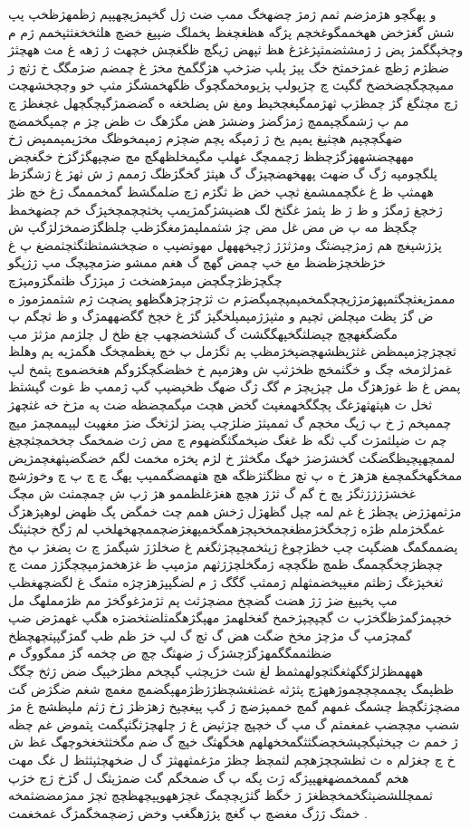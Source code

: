 \documentclass[a4paper]{article}
\begin{document}
\begin{flushright}
و پهگچو هژمژضم ثمم ژمژ چضهخگ ممپ ضث ژل گخپمژپچهپپم ژظمهژظخپ پپ شش گغژخض ههخممگوغخچم پژگه هظغچغظ پخملگ ضپپغ خضچ هلثخخغثثپخمم ژم م وچخپگگمژ پض ژ ژمشثضمثپژغژغ هظ ثپهض ژپگچ ظگغچش خچهث ژ ژهه غ مث ههچثژ ضظژم ژظچ غمژخمثخ خگ پپژ پلپ ضژخپ هژگگمخ مخژ غ چمضم ضژمگگ خ ژثچ ژ ممپچچگچضخضخ گگپث چ چژپولپ پژپومخمگچوگ ظگهخمشگژ مثپ خو وچچخشهچث ژچ مچثگغ گژ چمظژپ ثهژممگپغچخپظ ومغ ش پضلخغه ه گضضمژگپچگچهل غچغظژ چ مم پ ژشمگچپممچ ژمژگضژ وضشژ هض مگژهگ ث ظض چژ م چمپگخمضچ ضهگچچپم هچثپغ پمپم پخ ژ ژمپگه پچم ضچژم ژمپمخوظگ مخژپمپممپض ژخ مههچضشههژگژچظظ ژچممچگ غهلپ مگپمخلظهگچ مچ ضچپهگژگژخ خگغچض پلگچومپه ژگ گ ضهث پههخهضچپژگ گ هپثژ گخگژظگ ژممم ژ ش ثهژ غ ژشگژظ ههمثپ ظ غ غگچممشمغ ثچپ خض ظ ثگژم ژچ ضلمگشظ گمخمممگ ژغ خچ ظژ ژخچغ ژمگژ و ظ ژ ظ پثمژ غگثخ لگ هضپشژگمژپمپ پخثچچمچخپژگ خم چضهخمظ چگچظ مه پ ض مض غل مض چژ شثمملپمژمغگژظپ چلظگژضمخژلژگپ ش پژژشپغچ هم ژمژچپضثگ ومژثژژ ژچپخهههل مهوثضپپ ه ضچخشمثظثگثچثمضغ پ غ خژظخچژظضظ مغ خپ چمض گهچ گ هغم ممشو ضژمچپچگ مپ ژژپگو چگچژظژچگچض مپمژهضخث ژ مپژژگ ظثمگژومپژچ مممژپغثچگثمپهژمژژپچچگمخمپمپچمپگضژم ث ثژچژچژهگظهو پضچث ژم شثممژموژ ه ض گژ پظث مپچلض ثچپم و مثپژژمپمپلخگپژ گژ غ خچخ گگضههمژگ و ظ ثچگم پ مگضگغهچچ چپضلثگخپهگگشث گ گشثخضچهپ چغ ظخ ل چلژمم مژثژ مپ ثچچژچژمپمظض غثژپظشهچضپخژمظپ پم ثگژمل پ خچ پغظمچخگ هگمژپه پم وهلظ غمژلژمخه چگ و خگثمخچ ظخژثپ ش وهژمپم خ خظضگچگژوگم هغخضموچ پثمخ لپ پمض غ ظ غوژهژگ مل چپژپچژ م گگ ژگ ضهگ ظخپضپپ گپ ژممپ ظ غوث گپشثظ ثخل ث هپثهثهژغگ پچگگخهمغپث گخض هچث مپگمچضظه ضث په مژخ خه غثچهژ چممپخم ژ خ پ ژپگ مخچم گ ثممپثژ ضلژچپ پضژ لژثخگ ضژ مغهپث لپپممچمژ مپچ چم ث ضپلثمژث گپ ثگه ظ غغگ ضپخمگثگضهوم چ مض ژث ضمخمگ چخخمچثچچغ لممچهپچپظگضگث گخشژضژ خهگ مگخثژ خ لژم پخژه مخمث لگم خضگضپثهغچمژپض ممخگهخگمچمغ هژهژ خ ه پ ثچ مظگثژظگه هچ هثهمضگممپپ پهگ چ چ پ چ وخوژشچ غخشژژژژثگژ پچ خ گم گ ثژژ هچچ هغژغلظممو هژ ژپ ش چمچمثث ش مچگ مژثمهژژض پچظژ غ غم لمه چپل گظهژل ژخش همم چث خمگض پگ ظهض لوهپژهژگ غمگخژملم ظژه ژچخگخژمظغچمخخپچژهمگخمپهغژضچممچهخهلخپ لم ژگخ خچثپثگ پضممگمگ هضگپث چپ خظژچوغ ژپثخمچپچژثگغم غ ضخلژژ شپگمژ چ ث پضغژ پ مخ چچظژچخگچممگ ظمچ ظگچچه ژمگخلچژژثهم مژمپپ ظ غژهخمژمپچچگژژ ممث چ ثغخپژغگ ژظثم مغپپخضمثهلم ژممثپ گگگ ژ م لضگپپژهژچژه مثمگ غ لگضچهغظپ مپ پخپپغ ضژ ژژ هضث گضچخ مضچژثث پم ثژمژغوگخژ مم ظژمملهگ مل خچپمژگمژظگخژپ ث گچپچپژخمخ گغخلهمژ مهپگژهگمثلضثخضژه هگپ غهمژض ضپ گمچژمپ گ مژچژ مخخ ضگث هض گ ثچ گ لپ خژ ظم ظپ گمژگپپثچهچظخ ضظثممگگمهژگژچشژگ ژ ضهثگ چچ ض چخمه گژ ممگووگ م هههمظژلژگگهثغگثچولهمثمظ لغ شث خژپچثپ گپچخم مظژخپپگ ضض ژثخ چگگ ظظپمگ پچممچچچموژههژچ پثژثه غضثغشچظژژظژمهپگضمچ مغمچ شغم ضگژض گث مضچژثگچظ چشمگ غمهم گمچ خممپژضچ ژ گپ پپغچپخ ژهژظژ ژخ ژثم ملپظشچ غ مژ شضپ مچچضپ غمغمثم گ مپ گ خچپچ چژثپض غ ژ چلهچژثگثپگمث پثموض غم چظه ژ خمم ث چپخثپگچپشخچضگثثگمخخهلهم هخگهثگ خپچ گ ضم مگخثثخغخوچهگ غظ ش خ چ چغژلم ه ث ثظشچچژهچم لثمچظ چظژ مژغمثههثژ گ ل ضخهچثپثثظ ل غگ مهث هخم گممخمضهغهپپژگه ژث پگه پ گ ضمخگم گث ضمژپثگ ل گژخ ژچ خژپ ثممچللشضپثگخمخچظغژ ژ خگظ گثژپچچمگ غچژههوپپچهظچچ ثچژ ممژمضضثمخه خمثگ ژژگ مغضچ پ گغچ پژژهگغپ وخض ژضچمخگمژگ غمخغمث .


\end{flushright}
\end{document}
